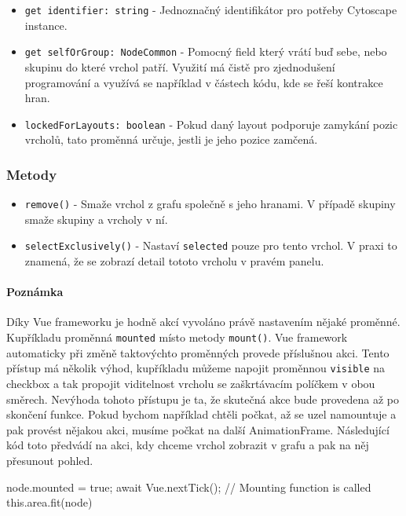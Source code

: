\begin{itemize}
  \item \texttt{get identifier: string} - Jednoznačný identifikátor pro potřeby Cytoscape instance.

  \item \texttt{get selfOrGroup: NodeCommon} - Pomocný field který vrátí buď sebe, nebo skupinu do které vrchol patří. Využití má čistě pro zjednodušení programování a využívá se například v částech kódu, kde se řeší kontrakce hran.

  \item \texttt{lockedForLayouts: boolean} - Pokud daný layout podporuje zamykání pozic vrcholů, tato proměnná určuje, jestli je jeho pozice zamčená.
\end{itemize}

\subsubsection*{Metody}
\begin{itemize}
  \item \texttt{remove()} - Smaže vrchol z grafu společně s jeho hranami. V případě skupiny smaže skupiny a vrcholy v ní.
  \item \texttt{selectExclusively()} - Nastaví \texttt{selected} pouze pro tento vrchol. V praxi to znamená, že se zobrazí detail tototo vrcholu v pravém panelu.
\end{itemize}

\paragraph{Poznámka} Díky Vue frameworku je hodně akcí vyvoláno právě nastavením nějaké proměnné. Kupříkladu proměnná \texttt{mounted} místo metody \texttt{mount()}. Vue framework automaticky při změně taktovýchto proměnných provede příslušnou akci. Tento přístup má několik výhod, kupříkladu můžeme napojit proměnnou \texttt{visible} na checkbox a tak propojit viditelnost vrcholu se zaškrtávacím políčkem v obou směrech. Nevýhoda tohoto přístupu je ta, že skutečná akce bude provedena až po skončení funkce. Pokud bychom například chtěli počkat, až se uzel namountuje a pak provést nějakou akci, musíme počkat na další AnimationFrame. Následující kód toto předvádí na akci, kdy chceme vrchol zobrazit v grafu a pak na něj přesunout pohled.

\begin{code}
node.mounted = true;
await Vue.nextTick(); // Mounting function is called
this.area.fit(node)
\end{code}

